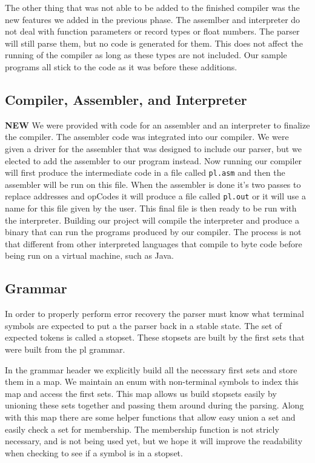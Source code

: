 \documentclass{article}
\begin{document}
The other thing that was not able to be added to the finished compiler was the
new features we added in the previous phase. The assemlber and interpreter do
not deal with function parameters or record types or float numbers. The parser
will still parse them, but no code is generated for them. This does not affect
the running of the compiler as long as these types are not included. Our sample
programs all stick to the code as it was before these additions.


\subsection{Compiler, Assembler, and Interpreter}
\textbf{NEW} We were provided with code for an assembler and an interpreter to finalize the
compiler. The assembler code was integrated into our compiler. We were given
a driver for the assembler that was designed to include our parser, but we
elected to add the assembler to our program instead. Now running our compiler
will first produce the intermediate code in a file called \verb|pl.asm| and then
the assembler will be run on this file. When the assembler is done it's two
passes to replace addresses and opCodes it will produce a file called \verb|pl.out|
or it will use a name for this file given by the user. This final file is then ready
to be run with the interpreter. Building our project will compile the interpreter and
produce a binary that can run the programs produced by our compiler. The process
is not that different from other interpreted languages that compile to byte code
before being run on a virtual machine, such as Java.


\subsection{Grammar}
In order to properly perform error recovery the parser must know what terminal symbols are expected
to put a the parser back in a stable state. The set of expected tokens is called a stopset.
These stopsets are built by the first sets that were built from the pl grammar.

In the grammar header we explicitly build all the necessary first sets and store them in a map.
We maintain an enum with non-terminal symbols to index this map and access the first sets.
This map allows us build stopsets easily by unioning these sets together and passing them around during the parsing.
Along with this map there are some helper functions that allow easy union a set and easily check a set for membership.
The membership function is not stricly necessary, and is not being used yet, but we hope it will
improve the readability when checking to see if a symbol is in a stopset.
\end{document}
